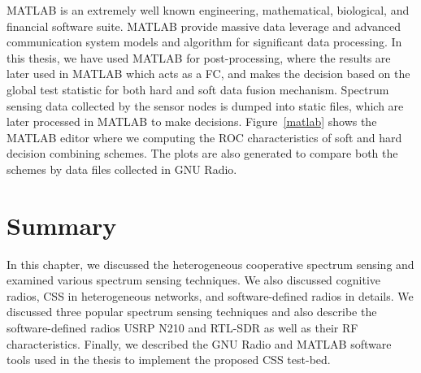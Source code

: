 MATLAB is an extremely well known engineering, mathematical, biological, and financial software suite. MATLAB provide massive data leverage and advanced communication system models and algorithm for significant data processing. In this thesis, we have used MATLAB for post-processing, where the results are later used in MATLAB which acts as a FC, and makes the decision based on the global test statistic for both hard and soft data fusion mechanism. Spectrum sensing data collected by the sensor nodes is dumped into static files, which are later processed in MATLAB to make decisions. Figure~\ref{matlab} shows the MATLAB editor where we computing the ROC characteristics of soft and hard decision combining schemes. The plots are also generated to compare both the schemes by data files collected in GNU Radio.

\section{Summary}
In this chapter, we discussed the heterogeneous cooperative spectrum sensing and examined various spectrum sensing techniques. We also discussed cognitive radios, CSS in heterogeneous networks, and software-defined radios in details. We discussed three popular spectrum sensing techniques and also describe the software-defined radios USRP N210 and RTL-SDR as well as their RF characteristics. Finally, we described the GNU Radio and MATLAB software tools used in the thesis to implement the proposed CSS test-bed. 
